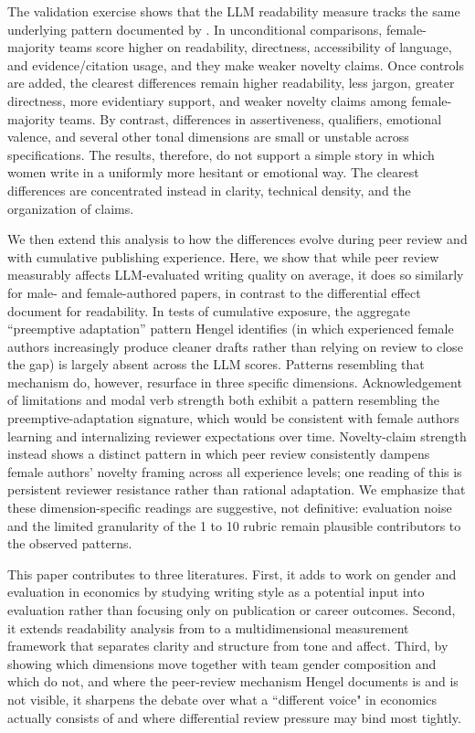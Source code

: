 The validation exercise shows that the LLM readability measure tracks the same underlying pattern documented by \textcite{hengel2022publishing}. In unconditional comparisons, female-majority teams score higher on readability, directness, accessibility of language, and evidence/citation usage, and they make weaker novelty claims. Once controls are added, the clearest differences remain higher readability, less jargon, greater directness, more evidentiary support, and weaker novelty claims among female-majority teams. By contrast, differences in assertiveness, qualifiers, emotional valence, and several other tonal dimensions are small or unstable across specifications. The results, therefore, do not support a simple story in which women write in a uniformly more hesitant or emotional way. The clearest differences are concentrated instead in clarity, technical density, and the organization of claims.

We then extend this analysis to how the differences evolve during peer review and with cumulative publishing experience. Here, we show that while peer review measurably affects LLM-evaluated writing quality on average, it does so similarly for male- and female-authored papers, in contrast to the differential effect \textcite{hengel2022publishing} document for readability. In tests of cumulative exposure, the aggregate ``preemptive adaptation'' pattern Hengel identifies (in which experienced female authors increasingly produce cleaner drafts rather than relying on review to close the gap) is largely absent across the LLM scores. Patterns resembling that mechanism do, however, resurface in three specific dimensions. Acknowledgement of limitations and modal verb strength both exhibit a pattern resembling the preemptive-adaptation signature, which would be consistent with female authors learning and internalizing reviewer expectations over time. Novelty-claim strength instead shows a distinct pattern in which peer review consistently dampens female authors' novelty framing across all experience levels; one reading of this is persistent reviewer resistance rather than rational adaptation. We emphasize that these dimension-specific readings are suggestive, not definitive: evaluation noise and the limited granularity of the 1 to 10 rubric remain plausible contributors to the observed patterns.

This paper contributes to three literatures. First, it adds to work on gender and evaluation in economics by studying writing style as a potential input into evaluation rather than focusing only on publication or career outcomes. Second, it extends readability analysis from \textcite{hengel2022publishing} to a multidimensional measurement framework that separates clarity and structure from tone and affect. Third, by showing which dimensions move together with team gender composition and which do not, and where the peer-review mechanism Hengel documents is and is not visible, it sharpens the debate over what a ``different voice" in economics actually consists of and where differential review pressure may bind most tightly.

